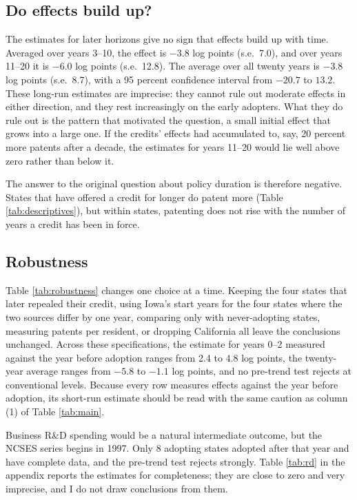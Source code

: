 \documentclass[12pt]{article}
\begin{document}
\subsection{Do effects build up?}

The estimates for later horizons give no sign that effects build up with time. Averaged over years 3--10, the
effect is $-3.8$ log points (s.e.\ 7.0), and over years 11--20 it is $-6.0$ log points (s.e.\ 12.8). The average
over all twenty years is $-3.8$ log points (s.e.\ 8.7), with a 95 percent confidence interval from $-20.7$ to
$13.2$. These long-run estimates are imprecise: they cannot rule out moderate effects in either direction, and
they rest increasingly on the early adopters. What they do rule out is the pattern that motivated the question,
a small initial effect that grows into a large one. If the credits' effects had accumulated to, say, 20 percent
more patents after a decade, the estimates for years 11--20 would lie well above zero rather than below it.

The answer to the original question about policy duration is therefore negative. States that have offered
a credit for longer do patent more (Table \ref{tab:descriptives}), but within states, patenting does not rise
with the number of years a credit has been in force.

\subsection{Robustness}

Table \ref{tab:robustness} changes one choice at a time. Keeping the four states that later repealed their
credit, using Iowa's start years for the four states where the two sources differ by one year, comparing only
with never-adopting states, measuring patents per resident, or dropping California all leave the conclusions
unchanged. Across these specifications, the estimate for years 0--2 measured against the year before adoption
ranges from 2.4 to 4.8 log points, the twenty-year average ranges from $-5.8$ to $-1.1$ log points, and no
pre-trend test rejects at conventional levels. Because every row measures effects against the year before
adoption, its short-run estimate should be read with the same caution as column (1) of Table \ref{tab:main}.

{\setlength{\tabcolsep}{3pt}}

Business R\&D spending would be a natural intermediate outcome, but the NCSES series begins in 1997. Only 8
adopting states adopted after that year and have complete data, and the pre-trend test rejects strongly. Table
\ref{tab:rd} in the appendix reports the estimates for completeness; they are close to zero and very imprecise,
and I do not draw conclusions from them.
\end{document}
